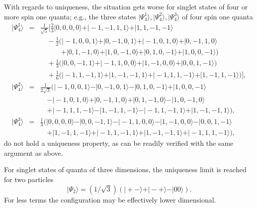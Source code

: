 \documentclass{aipproc}
\begin{document}
With regards to uniqueness, the situation gets worse for singlet states of four or more spin one quanta;
e.g., the three states $\vert \Psi_4^1\rangle , \vert \Psi_4^2\rangle , \vert \Psi_4^3\rangle$
of four spin one quanta \cite{schimpf-svozil}
\begin{eqnarray}
\vert \Psi_4^1\rangle  &=&
\frac{1}{\sqrt{5}}
\big[
\frac{2}{3}
\vert0,0,0,0\rangle
+
\vert -1,-1,1,1\rangle  +\vert 1,1,-1,-1\rangle
\nonumber \\
&&\quad
- \frac{1}{2}
\big(
\vert-1,0,0,1\rangle
+\vert0,-1,0,1\rangle
+\vert-1,0,1,0\rangle
+\vert0,-1,1,0\rangle \nonumber   \\
&&\quad
\qquad
+\vert0,1,-1,0\rangle
+\vert 1,0,-1,0\rangle
+\vert0,1,0,-1\rangle
+\vert1,0,0,-1\rangle
\big)\nonumber \\
&&\quad
+\frac{1}{3}
\big(
\vert0,0,-1,1\rangle
+\vert -1,1,0,0\rangle
+\vert1,-1,0,0\rangle
+\vert0,0,1,-1\rangle
\big)\nonumber \\
&&\quad
+
\frac{1}{6}
\big(
\vert-1,1,-1,1\rangle
+\vert1,-1,-1,1\rangle
+\vert-1,1,1,-1\rangle
+\vert1,-1,1,-1\rangle
\big)
\big] ,
 \\
\vert \Psi_4^2\rangle  &=&\frac{1}{2{\sqrt{3}}}
\big(
\vert -1,0,0,1\rangle
- \vert 0,-1,0,1\rangle
- \vert 0,1,0,-1\rangle
+\vert 1,0,0,-1\rangle  \nonumber \\
&&\quad
- \vert -1,0,1,0\rangle
+\vert 0,-1,1,0\rangle
+\vert 0,1,-1,0\rangle
- \vert 1,0,-1,0\rangle \nonumber    \\
&&\quad
+\vert -1,1,1,-1\rangle
- \vert 1,-1,1,-1\rangle
- \vert -1,1,-1,1\rangle
+\vert 1,-1,-1,1\rangle
\big) ,
  \\
  \vert \Psi_4^3\rangle &=& \frac{1}{3}
\big(
\vert 0,0,0,0\rangle
-
\vert 0,0,-1,1\rangle
-
\vert -1,1,0,0\rangle
-
\vert 1,-1,0,0\rangle
-
\vert 0,0,1,-1\rangle
\nonumber  \\
&& \quad
+
\vert 1,-1,1,-1\rangle
+
\vert -1,1,-1,1\rangle
+
\vert 1,-1,-1,1\rangle
+
\vert -1,1,1,-1\rangle
\big) ,
\end{eqnarray}
do not hold a uniqueness property, as can be readily verified with the same argument as above.


For singlet states of quanta of three dimensions, the uniqueness limit is reached for two particles
$$
\vert \Psi_2 \rangle
= ({1/ \sqrt{3}})(
\vert + -\rangle
+
\vert - +\rangle
-
\vert 0 0\rangle
).$$
For less terms the configuration may be effectively lower dimensional.
\end{document}
